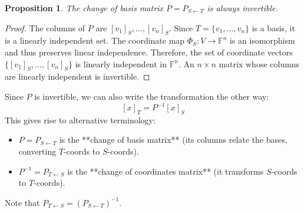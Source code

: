 \documentclass[11pt]{article}
\newtheorem{proposition}[theorem]{Proposition}
\theoremstyle{definition}
\theoremstyle{remark}
\newcommand{\F}{\mathbb{F}}
\newcommand{\Fn}[1]{\F^{#1}}
\newcommand{\coord}[2]{[#1]_{#2}} %
\begin{document}
\begin{proposition}
    The change of basis matrix $P = P_{S \leftarrow T}$ is always invertible.
\end{proposition}
\begin{proof}
    The columns of $P$ are $\coord{v_1}{S}, \dots, \coord{v_n}{S}$. Since $T = \{v_1, \dots, v_n\}$ is a basis, it is a linearly independent set. The coordinate map $\Phi_S: V \to \Fn{n}$ is an isomorphism and thus preserves linear independence. Therefore, the set of coordinate vectors $\{\coord{v_1}{S}, \dots, \coord{v_n}{S}\}$ is linearly independent in $\Fn{n}$. An $n \times n$ matrix whose columns are linearly independent is invertible.
\end{proof}

Since $P$ is invertible, we can also write the transformation the other way:
\[ \coord{x}{T} = P^{-1} \coord{x}{S} \]
This gives rise to alternative terminology:
\begin{itemize}
    \item $P = P_{S \leftarrow T}$ is the **change of basis matrix** (its columns relate the bases, converting $T$-coords to $S$-coords).
    \item $P^{-1} = P_{T \leftarrow S}$ is the **change of coordinates matrix** (it transforms $S$-coords to $T$-coords).
\end{itemize}
Note that $P_{T \leftarrow S} = (P_{S \leftarrow T})^{-1}$.
\end{document}
